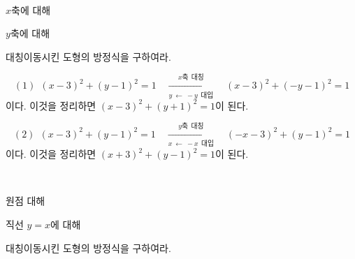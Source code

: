 \documentclass{oblivoir}
\begin{document}
%
\\[-5pt]\label{review5}
\begin{enumerate*}[itemjoin=\tabto{.5\textwidth}]
\item
\(x\)축에 대해
\item
\(y\)축에 대해
\end{enumerate*}\par\bigskip\noindent
대칭이동시킨 도형의 방정식을 구하여라.
\begin{mdframed}
\[(1)\:\:
(x-3)^2+(y-1)^2=1
\quad\xrightarrow[y\:\leftarrow\: -y\:\:대입]{x축\:\:대칭}\quad
(x-3)^2+(-y-1)^2=1\]
이다.
이것을 정리하면
\((x-3)^2+(y+1)^2=1\)이 된다.

\[(2)\:\:
(x-3)^2+(y-1)^2=1
\quad\xrightarrow[x\:\leftarrow\: -x\:\:대입]{y축\:\:대칭}\quad
(-x-3)^2+(y-1)^2=1\]
이다.
이것을 정리하면
\((x+3)^2+(y-1)^2=1\)이 된다.
\end{mdframed}

%
\\[-5pt]\label{review6}
\begin{enumerate*}[itemjoin=\tabto{.5\textwidth}]
\item
원점 대해
\item
직선 \(y=x\)에 대해
\end{enumerate*}\par\bigskip\noindent
대칭이동시킨 도형의 방정식을 구하여라.


%
%
\end{document}
